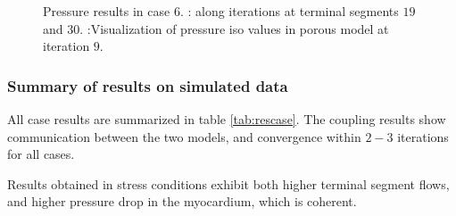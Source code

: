 \documentclass[a4paper, 11pt]{article} %
\begin{document}
\begin{figure}[hbtp]
\begin{center}
\caption{Pressure results in case 6. \protect{}: along iterations at terminal segments $19$ and $30$. \protect{}:Visualization of pressure iso values in porous model at iteration $9$.}
\label{fig:prcase6}
\end{center}
\end{figure}



\subsubsection{Summary of results on simulated data}
All case results are summarized in table \ref{tab:rescase}.
The coupling results show communication between the two models, and convergence within $2-3$ iterations for all cases.

Results obtained in stress conditions exhibit both higher terminal segment flows, and higher pressure drop in the myocardium, which is coherent.
\end{document}
